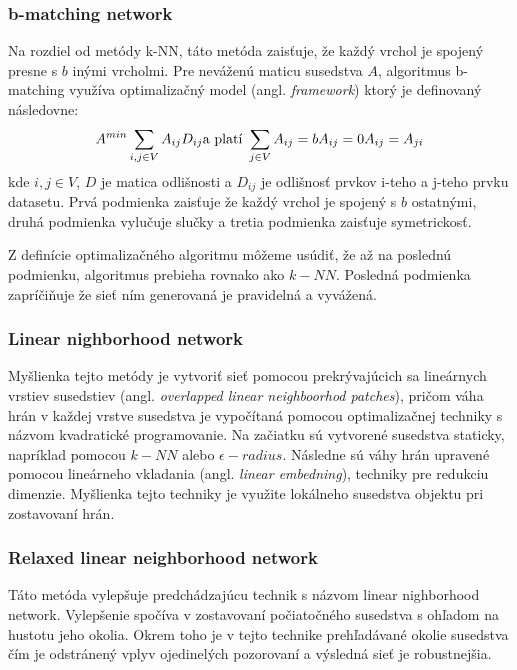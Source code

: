 \documentclass[slovak,master,dept460,male,cpp,cpdeclaration]{diploma}
\begin{document}
\subsubsection{b-matching network}
Na rozdiel od metódy k-NN, táto metóda zaisťuje, že každý vrchol je spojený presne s $b$ inými vrcholmi. Pre neváženú maticu susedstva $A$, algoritmus b-matching využíva optimalizačný model (angl. \textit{framework}) ktorý je definovaný následovne: 
\begin{equation}
A^{min} \sum_{i,j \in V}{A_{ij} D_{ij}} \\
\text{a platí } \\
\sum_{j \in V}{A_{ij} = b} \\
A_{ij} = 0 \\
A_{ij} = A_{ji}
\end{equation}
kde $i,j \in V$, $D$ je matica odlišnosti a $D_{ij}$ je odlišnosť prvkov i-teho a j-teho prvku datasetu. Prvá podmienka zaisťuje že každý vrchol je spojený s $b$ ostatnými, druhá podmienka vylučuje slučky a tretia podmienka zaisťuje symetrickosť.

Z definície optimalizačného algoritmu môžeme usúdiť, že až na poslednú podmienku, algoritmus prebieha rovnako ako $k-NN$.  Posledná podmienka zapríčiňuje že sieť ním generovaná je pravidelná a vyvážená. \cite{b_matcing}

\subsubsection{Linear nighborhood network}
Myšlienka tejto metódy je vytvoriť sieť pomocou prekrývajúcich sa lineárnych vrstiev susedstiev (angl. \textit{overlapped linear neighboorhod patches}), pričom váha hrán v každej vrstve susedstva je vypočítaná pomocou optimalizačnej techniky s názvom kvadratické programovanie.
Na začiatku sú vytvorené susedstva staticky, napríklad pomocou \(k-NN\) alebo \(\epsilon-radius\). Následne sú váhy hrán upravené pomocou lineárneho vkladania (angl. \textit{linear embedning}), techniky pre redukciu dimenzie. Myšlienka tejto techniky je využite lokálneho susedstva objektu pri zostavovaní hrán. \cite{linear_neighborhood}

\subsubsection{Relaxed linear neighborhood network}
Táto metóda vylepšuje predchádzajúcu technik s názvom linear nighborhood network. Vylepšenie spočíva v zostavovaní počiatočného susedstva s ohľadom na hustotu jeho okolia. Okrem toho je v tejto technike prehľadávané okolie susedstva čím je odstránený vplyv ojedinelých pozorovaní a výsledná sieť je robustnejšia. \cite{relaxed_neghborhood_network}
\end{document}
